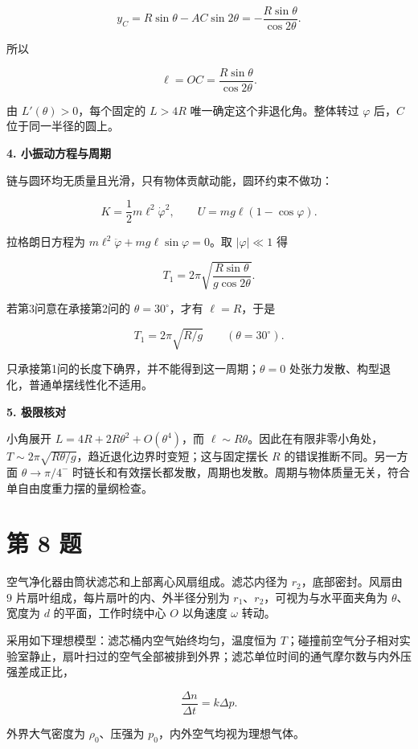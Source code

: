 \documentclass[12pt,a4paper,UTF8]{ctexart}
\begin{document}
\[y_C=R\sin\theta-AC\sin2\theta=-\frac{R\sin\theta}{\cos2\theta}.\]

所以

\[\boxed{\ell=OC=\frac{R\sin\theta}{\cos2\theta}}.\]

由 \(L'(\theta)>0\)，每个固定的 \(L>4R\) 唯一确定这个非退化角。整体转过
\(\varphi\) 后，\(C\) 位于同一半径的圆上。

\textbf{4. 小振动方程与周期}

链与圆环均无质量且光滑，只有物体贡献动能，圆环约束不做功：

\[K=\frac12m\ell^2\dot\varphi^2,\qquad U=mg\ell(1-\cos\varphi).\]

拉格朗日方程为 \(m\ell^2\ddot\varphi+mg\ell\sin\varphi=0\)。取
\(|\varphi|\ll1\) 得

\[\boxed{T_1=2\pi\sqrt{\frac{R\sin\theta}{g\cos2\theta}}}.\]

若第3问意在承接第2问的 \(\theta=30^\circ\)，才有 \(\ell=R\)，于是

\[\boxed{T_1=2\pi\sqrt{R/g}}\qquad(\theta=30^\circ).\]

只承接第1问的长度下确界，并不能得到这一周期；\(\theta=0\)
处张力发散、构型退化，普通单摆线性化不适用。

\textbf{5. 极限核对}

小角展开 \(L=4R+2R\theta^2+O(\theta^4)\)，而
\(\ell\sim R\theta\)。因此在有限非零小角处，\(T\sim2\pi\sqrt{R\theta/g}\)，趋近退化边界时变短；这与固定摆长
\(R\) 的错误推断不同。另一方面 \(\theta\to\pi/4^-\)
时链长和有效摆长都发散，周期也发散。周期与物体质量无关，符合单自由度重力摆的量纲检查。

\newpage

\section{第 8 题}\label{ux7b2c-8-ux9898}

空气净化器由筒状滤芯和上部离心风扇组成。滤芯内径为
\(r_2\)，底部密封。风扇由 \(9\) 片扇叶组成，每片扇叶的内、外半径分别为
\(r_1\)、\(r_2\)，可视为与水平面夹角为 \(\theta\)、宽度为 \(d\)
的平面，工作时绕中心 \(O\) 以角速度 \(\omega\) 转动。

采用如下理想模型：滤芯桶内空气始终均匀，温度恒为
\(T\)；碰撞前空气分子相对实验室静止，扇叶扫过的空气全部被排到外界；滤芯单位时间的通气摩尔数与内外压强差成正比，

\[
\frac{\Delta n}{\Delta t}=k\Delta p.
\]

外界大气密度为 \(\rho_0\)、压强为 \(p_0\)，内外空气均视为理想气体。
\end{document}
